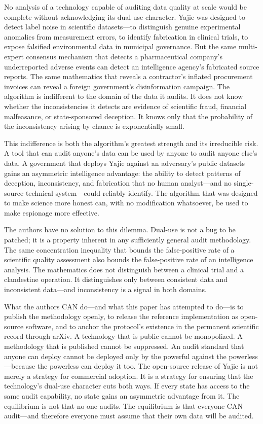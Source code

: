 \documentclass[12pt,a4paper]{ctexart}
\theoremstyle{definition}
\theoremstyle{remark}
\begin{document}
No analysis of a technology capable of auditing data quality at scale would be complete without acknowledging its dual-use character. Yajie was designed to detect label noise in scientific datasets—to distinguish genuine experimental anomalies from measurement errors, to identify fabrication in clinical trials, to expose falsified environmental data in municipal governance. But the same multi-expert consensus mechanism that detects a pharmaceutical company's underreported adverse events can detect an intelligence agency's fabricated source reports. The same mathematics that reveals a contractor's inflated procurement invoices can reveal a foreign government's disinformation campaign. The algorithm is indifferent to the domain of the data it audits. It does not know whether the inconsistencies it detects are evidence of scientific fraud, financial malfeasance, or state-sponsored deception. It knows only that the probability of the inconsistency arising by chance is exponentially small.

This indifference is both the algorithm's greatest strength and its irreducible risk. A tool that can audit anyone's data can be used by anyone to audit anyone else's data. A government that deploys Yajie against an adversary's public datasets gains an asymmetric intelligence advantage: the ability to detect patterns of deception, inconsistency, and fabrication that no human analyst—and no single-source technical system—could reliably identify. The algorithm that was designed to make science more honest can, with no modification whatsoever, be used to make espionage more effective.

The authors have no solution to this dilemma. Dual-use is not a bug to be patched; it is a property inherent in any sufficiently general audit methodology. The same concentration inequality that bounds the false-positive rate of a scientific quality assessment also bounds the false-positive rate of an intelligence analysis. The mathematics does not distinguish between a clinical trial and a clandestine operation. It distinguishes only between consistent data and inconsistent data—and inconsistency is a signal in both domains.

What the authors CAN do—and what this paper has attempted to do—is to publish the methodology openly, to release the reference implementation as open-source software, and to anchor the protocol's existence in the permanent scientific record through arXiv. A technology that is public cannot be monopolized. A methodology that is published cannot be suppressed. An audit standard that anyone can deploy cannot be deployed only by the powerful against the powerless—because the powerless can deploy it too. The open-source release of Yajie is not merely a strategy for commercial adoption. It is a strategy for ensuring that the technology's dual-use character cuts both ways. If every state has access to the same audit capability, no state gains an asymmetric advantage from it. The equilibrium is not that no one audits. The equilibrium is that everyone CAN audit—and therefore everyone must assume that their own data will be audited.
\end{document}

